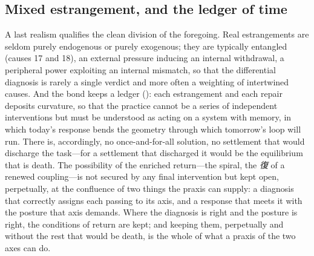 \subsection{Mixed estrangement, and the ledger of time}
\label{p17:sub:praxis-time}

A last realism qualifies the clean division of the foregoing. Real estrangements are seldom purely endogenous or purely exogenous; they are typically entangled (causes 17 and 18), an external pressure inducing an internal withdrawal, a peripheral power exploiting an internal mismatch, so that the differential diagnosis is rarely a single verdict and more often a weighting of intertwined causes. And the bond keeps a ledger (): each estrangement and each repair deposits curvature, so that the practice cannot be a series of independent interventions but must be understood as acting on a system with memory, in which today's response bends the geometry through which tomorrow's loop will run. There is, accordingly, no once-and-for-all solution, no settlement that would discharge the task---for a settlement that discharged it would be the equilibrium that is death. The possibility of the enriched return---the spiral, the \emph{復} of a renewed coupling---is not secured by any final intervention but kept open, perpetually, at the confluence of two things the praxis can supply: a diagnosis that correctly assigns each passing to its axis, and a response that meets it with the posture that axis demands. Where the diagnosis is right and the posture is right, the conditions of return are kept; and keeping them, perpetually and without the rest that would be death, is the whole of what a praxis of the two axes can do.
